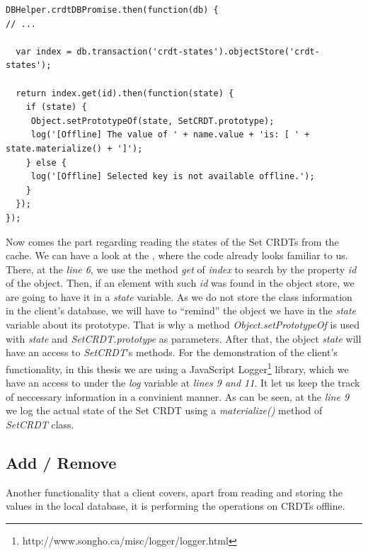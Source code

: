 \begin{lstlisting}[caption={Reading CRDT states from client's cache.}, label={lst:dev10}]
DBHelper.crdtDBPromise.then(function(db) {
// ...

  var index = db.transaction('crdt-states').objectStore('crdt-states');

  return index.get(id).then(function(state) {
    if (state) {
     Object.setPrototypeOf(state, SetCRDT.prototype);
     log('[Offline] The value of ' + name.value + 'is: [ ' + state.materialize() + ']');
    } else {
     log('[Offline] Selected key is not available offline.');
    }
  });
});
\end{lstlisting}

Now comes the part regarding reading the states of the Set CRDTs from the cache. We can have a look at the , where the code already looks familiar to us. There, at the \textit{line 6}, we use the method \textit{get} of \textit{index} to search by the property \textit{id} of the object. Then, if an element with such \textit{id} was found in the object store, we are going to have it in a \textit{state} variable. As we do not store the class information in the client's database, we will have to ``remind'' the object we have in the \textit{state} variable about its prototype. That is why a method \textit{Object.setPrototypeOf} is used with \textit{state} and \textit{SetCRDT.prototype} as parameters. After that, the object \textit{state} will have an access to \textit{SetCRDT}'s methods. For the demonstration of the client's functionality, in this thesis we are using a JavaScript Logger\footnote{http://www.songho.ca/misc/logger/logger.html} library, which we have an access to under the \textit{log} variable at \textit{lines 9 and 11}. It let us keep the track of neccessary information in a convinient manner. As can be seen, at the \textit{line 9} we log the actual state of the Set CRDT using a \textit{materialize()} method of \textit{SetCRDT} class.

\subsection*{Add / Remove}

Another functionality that a client covers, apart from reading and storing the values in the local database, it is performing the operations on CRDTs offline.


